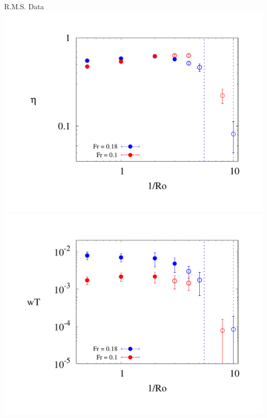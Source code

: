 \documentclass{beamer}
\begin{document}
\begin{frame}{R.M.S. Data}
        \centering
        \includegraphics[width=1\textwidth]{images/mixing_plot.pdf}
    \emp
        \centering
        \includegraphics[width=1\textwidth]{images/bflux_plot.pdf}
    \emp

\end{frame}
\end{document}
